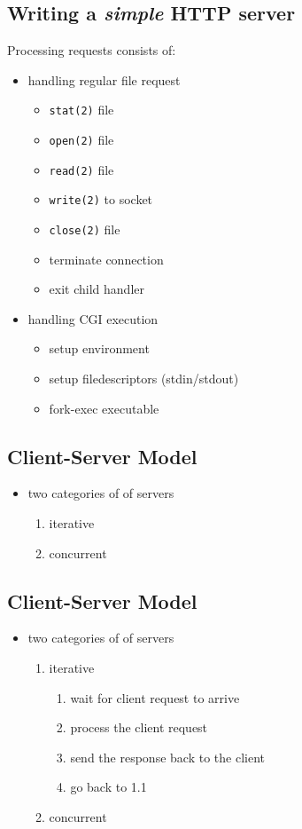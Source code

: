 \documentclass[xga]{xdvislides}
\begin{document}
\subsection{Writing a {\em simple} HTTP server}
Processing requests consists of:
\begin{itemize}
	\item handling regular file request
		\begin{itemize}
			\item {\tt stat(2)} file
			\item {\tt open(2)} file
			\item {\tt read(2)} file
			\item {\tt write(2)} to socket
			\item {\tt close(2)} file
			\item terminate connection
			\item exit child handler
		\end{itemize}
	\item handling CGI execution
		\begin{itemize}
			\item setup environment
			\item setup filedescriptors (stdin/stdout)
			\item fork-exec executable
		\end{itemize}
\end{itemize}



\subsection{Client-Server Model}
\begin{itemize}
	\item two categories of of servers
		\begin{enumerate}
			\item iterative
			\item concurrent
		\end{enumerate}
\end{itemize}

\subsection{Client-Server Model}
\begin{itemize}
	\item two categories of of servers
		\begin{enumerate}
			\item iterative
				\begin{enumerate}
					\item wait for client request to arrive
					\item process the client request
					\item send the response back to the client
					\item go back to 1.1
				\end{enumerate}
			\item concurrent
		\end{enumerate}
\end{itemize}
\end{document}
